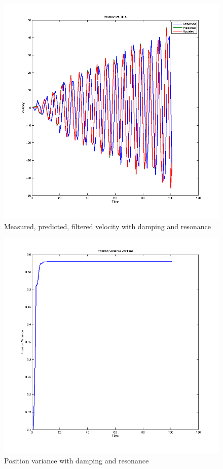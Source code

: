 \documentclass[12pt]{article}
\begin{document}
\begin{figure}
    \includegraphics[width=\linewidth]{kalman-velocity-damping}
    \caption{Measured, predicted, filtered velocity with damping and resonance}
\end{figure}

\begin{figure}
    \includegraphics[width=\linewidth]{kalman-variance1-damping}
    \caption{Position variance with damping and resonance}
\end{figure}
\end{document}
